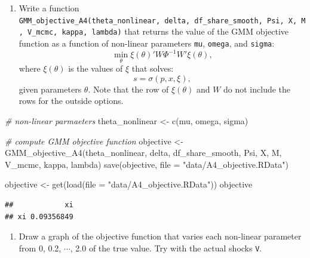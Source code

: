 \documentclass[
]{book}
\newenvironment{Shaded}{\begin{snugshade}}{\end{snugshade}}
\newcommand{\AttributeTok}[1]{\textcolor[rgb]{0.77,0.63,0.00}{#1}}
\newcommand{\CommentTok}[1]{\textcolor[rgb]{0.56,0.35,0.01}{\textit{#1}}}
\newcommand{\FunctionTok}[1]{\textcolor[rgb]{0.00,0.00,0.00}{#1}}
\newcommand{\NormalTok}[1]{#1}
\newcommand{\OtherTok}[1]{\textcolor[rgb]{0.56,0.35,0.01}{#1}}
\newcommand{\StringTok}[1]{\textcolor[rgb]{0.31,0.60,0.02}{#1}}
\providecommand{\tightlist}{%
  \setlength{\itemsep}{0pt}\setlength{\parskip}{0pt}}
\begin{document}
\begin{enumerate}
\def\labelenumi{\arabic{enumi}.}
\setcounter{enumi}{10}
\tightlist
\item
  Write a function \texttt{GMM\_objective\_A4(theta\_nonlinear,\ delta,\ df\_share\_smooth,\ Psi,\ X,\ M,\ V\_mcmc,\ kappa,\ lambda)} that returns the value of the GMM objective function as a function of non-linear parameters \texttt{mu}, \texttt{omega}, and \texttt{sigma}:
  \[
  \min_{\theta} \xi(\theta)' W \Phi^{-1} W' \xi(\theta),
  \]
  where \(\xi(\theta)\) is the values of \(\xi\) that solves:
  \[
  s = \sigma(p, x, \xi),
  \]
  given parameters \(\theta\). Note that the row of \(\xi(\theta)\) and \(W\) do not include the rows for the outside options.
\end{enumerate}

\begin{Shaded}
\begin{Highlighting}[]
\CommentTok{\# non{-}linear parmaeters}
\NormalTok{theta\_nonlinear }\OtherTok{\textless{}{-}} \FunctionTok{c}\NormalTok{(mu, omega, sigma)}
\end{Highlighting}
\end{Shaded}

\begin{Shaded}
\begin{Highlighting}[]
\CommentTok{\# compute GMM objective function}
\NormalTok{objective }\OtherTok{\textless{}{-}}
  \FunctionTok{GMM\_objective\_A4}\NormalTok{(theta\_nonlinear, delta, df\_share\_smooth, Psi, }
\NormalTok{                   X, M, V\_mcmc, kappa, lambda) }
\FunctionTok{save}\NormalTok{(objective, }\AttributeTok{file =} \StringTok{"data/A4\_objective.RData"}\NormalTok{)}
\end{Highlighting}
\end{Shaded}

\begin{Shaded}
\begin{Highlighting}[]
\NormalTok{objective }\OtherTok{\textless{}{-}} \FunctionTok{get}\NormalTok{(}\FunctionTok{load}\NormalTok{(}\AttributeTok{file =} \StringTok{"data/A4\_objective.RData"}\NormalTok{))}
\NormalTok{objective}
\end{Highlighting}
\end{Shaded}

\begin{verbatim}
##            xi
## xi 0.09356849
\end{verbatim}

\begin{enumerate}
\def\labelenumi{\arabic{enumi}.}
\setcounter{enumi}{11}
\tightlist
\item
  Draw a graph of the objective function that varies each non-linear parameter from 0, 0.2, \(\cdots\), 2.0 of the true value. Try with the actual shocks \texttt{V}.
\end{enumerate}
\end{document}
